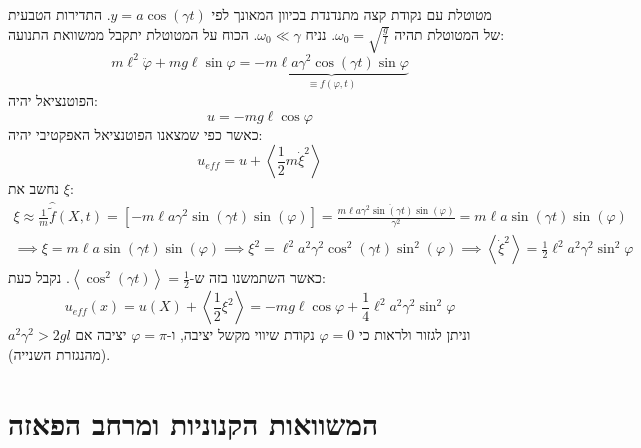 \documentclass{tstextbook}
\begin{document}
\begin{example}
מטוטלת עם נקודת קצה מתנדנדת בכיוון המאונך לפי \(y=a\cos\left( \gamma t \right)\). 
התדירות הטבעית של המטוטלת תהיה \(\omega_{0}=\sqrt{ \frac{g}{l} }\). נניח \(\omega_{0}\ll \gamma\). הכוח על המטוטלת יתקבל ממשוואת התנועה:
$$m\ell^{2}{\ddot{\varphi}}+m g\ell\sin\varphi=\underbrace{-m\ell a\gamma^{2}\cos\left(\gamma t\right)\sin\varphi}_{\equiv f(\varphi,t)}$$
הפוטנציאל יהיה:
$$u=-mg\ell \cos \varphi$$
כאשר כפי שמצאנו הפוטנציאל האפקטיבי יהיה:
$$u_{eff}=u+\left\langle  \frac{1}{2}m\dot{\xi}^2 \right\rangle $$
נחשב את \(\xi\):
$$\begin{array}{c}{{\xi\approx\displaystyle\frac{1}{m}\hat{\tilde{f}}\left(X,t\right)=\left[-m\ell a\gamma^{2}\sin\left(\gamma t\right)\sin\left(\varphi\right)\right]=\displaystyle\frac{m\ell a\gamma^{2}\ddot{\sin\left(\gamma t\right)}\sin\left(\varphi\right)}{\gamma^{2}}=m\ell a\sin\left(\gamma t\right)\sin\left(\varphi\right)}}\\ {{\implies  \xi=m\ell a\sin\left(\gamma t\right)\sin\left(\varphi\right)}} {{\implies \xi^{2}=\ell^{2}a^{2}\gamma^{2}\cos^{2}\left(\gamma t\right)\sin^{2}\left(\varphi\right)}} {{\implies  \left\langle\dot{\xi}^{2}\right\rangle=\frac{1}{2}\ell^{2}a^{2}\gamma^{2}\sin^{2}\varphi}}\end{array}$$
כאשר השתמשנו בזה ש-\(\left\langle  \cos^2\left( \gamma t \right) \right\rangle=\frac{1}{2}\). נקבל כעת:
$$u_{e f f}\left(x\right)=u\left(X\right)+\left\langle\frac{1}{2}\xi^{2}\right\rangle=-m g\ell\cos\varphi+\frac{1}{4}\ell^{2}a^{2}\gamma^{2}\sin^{2}\varphi$$
וניתן לגזור ולראות כי \(\varphi=0\) נקודת שיווי מקשל יציבה, ו-\(\varphi=\pi\) יציבה אם \(a^2\gamma^2>2gl\)(מהנגזרת השנייה).

\end{example}

\section{המשוואות הקנוניות ומרחב הפאזה}
\end{document}
